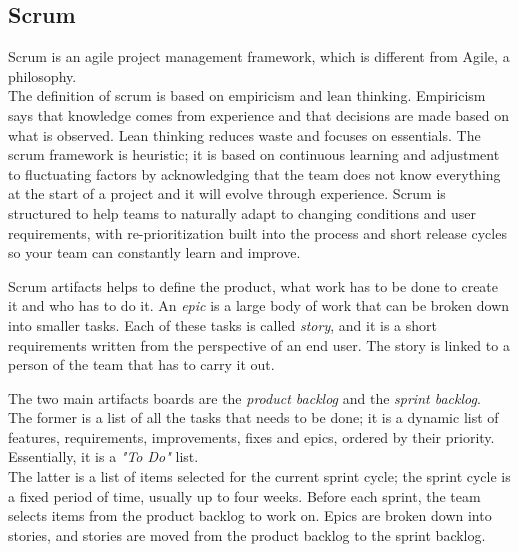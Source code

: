 \subsection{Scrum}

Scrum is an agile project management framework, which is different from Agile, a philosophy.\\
The definition of scrum is based on empiricism and lean thinking. Empiricism says that knowledge comes from experience and that decisions are made based on what is observed. Lean thinking reduces waste and focuses on essentials. The scrum framework is heuristic; it is based on continuous learning and adjustment to fluctuating factors by acknowledging that the team does not know everything at the start of a project and it will evolve through experience. Scrum is structured to help teams to naturally adapt to changing conditions and user requirements, with re-prioritization built into the process and short release cycles so your team can constantly learn and improve.~\cite{scrum}

Scrum artifacts helps to define the product, what work has to be done to create it and who has to do it. An \textit{epic} is a large body of work that can be broken down into smaller tasks. Each of these tasks is called \textit{story}, and it is a short requirements written from the perspective of an end user. The story is linked to a person of the team that has to carry it out.

The two main artifacts boards are the \textit{product backlog} and the \textit{sprint backlog}. \\
The former is a list of all the tasks that needs to be done; it is a dynamic list of features, requirements, improvements, fixes and epics, ordered by their priority. Essentially, it is a \textit{"To Do"} list.\\
The latter is a list of items selected for the current sprint cycle; the sprint cycle is a fixed period of time, usually up to four weeks. Before each sprint, the team selects items from the product backlog to work on. Epics are broken down into stories, and stories are moved from the product backlog to the sprint backlog.~\cite{scrum-epic-stories}

